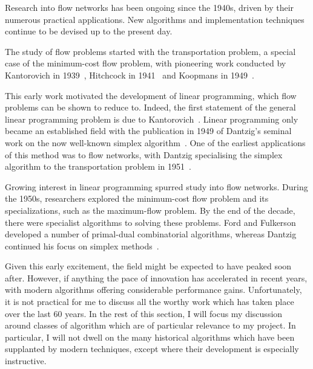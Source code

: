 Research into flow networks has been ongoing since the 1940s, driven by their numerous practical applications. New algorithms and implementation techniques continue to be devised up to the present day.

The study of flow problems started with the transportation problem, a special case of the minimum-cost flow problem, with pioneering work conducted by Kantorovich in 1939~\cite{Kantorovich:1960}, Hitchcock in 1941~\cite{Hitchcock:1941} and Koopmans in 1949~\cite{Koopmans:1949}.

This early work motivated the development of linear programming, which flow problems can be shown to reduce to. Indeed, the first statement of the general linear programming problem is due to Kantorovich~\cite{Kantorovich:1960}. Linear programming only became an established field with the publication in 1949 of Dantzig's seminal work on the now well-known simplex algorithm~\cite{Dantzig:1949}. One of the earliest applications of this method was to flow networks, with Dantzig specialising the simplex algorithm to the transportation problem in 1951~\cite{Dantzig:1951}.

Growing interest in linear programming spurred study into flow networks. During the 1950s, researchers explored the minimum-cost flow problem and its specializations, such as the maximum-flow problem. By the end of the decade, there were specialist algorithms to solving these problems. Ford and Fulkerson developed a number of primal-dual combinatorial algorithms, whereas Dantzig continued his focus on simplex methods~\cite{FordFulkerson:1962,Dantzig:1962}.

Given this early excitement, the field might be expected to have peaked soon after. However, if anything the pace of innovation has accelerated in recent years, with modern algorithms offering considerable performance gains. Unfortunately, it is not practical for me to discuss all the worthy work which has taken place over the last 60 years. In the rest of this section, I will focus my discussion around classes of algorithm which are of particular relevance to my project. In particular, I will not dwell on the many historical algorithms which have been supplanted by modern techniques, except where their development is especially instructive.